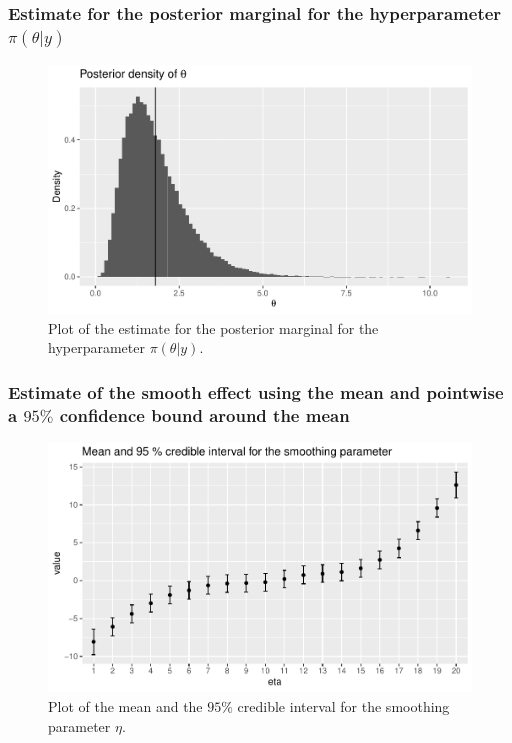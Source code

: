 \subsubsection{Estimate for the posterior marginal for the hyperparameter $\pi(\theta|y)$}
\begin{figure}[h!]
    \centering
    \includegraphics[width=\textwidth]{Images/post_theta_mcmc.pdf}
    \caption{Plot of the estimate for the posterior marginal for the hyperparameter $\pi(\theta|y)$.}
    \label{fig:post_theta_mcmc}
\end{figure}

\subsubsection{Estimate of the smooth effect using the mean and pointwise a $95 \%$ confidence bound around the mean}
\begin{figure}[h]
    \centering
    \includegraphics[width=\textwidth]{Images/post_eta_mcmc.pdf}
    \caption{Plot of the mean and the $95\%$ credible interval for the smoothing parameter $\eta$. }
    \label{fig:post_eta_mcmc}
\end{figure}

